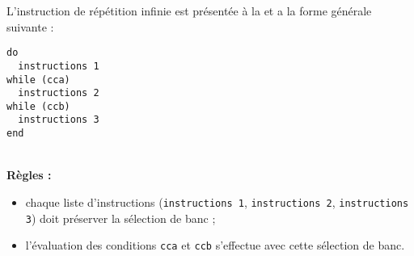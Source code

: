 
L'instruction de répétition infinie est présentée à la  et a la forme générale suivante :

\begin{lstlisting}[language=piccolo]
do
  instructions 1
while (cca)
  instructions 2
while (ccb)
  instructions 3
end
\end{lstlisting}

~\\
\textbf{Règles :}
\begin{itemize}
  \item chaque liste d'instructions (\texttt{instructions 1}, \texttt{instructions 2}, \texttt{instructions 3}) doit préserver la sélection de banc ;
  \item l'évaluation des conditions \texttt{cca} et \texttt{ccb} s'effectue avec cette sélection de banc.
\end{itemize}
